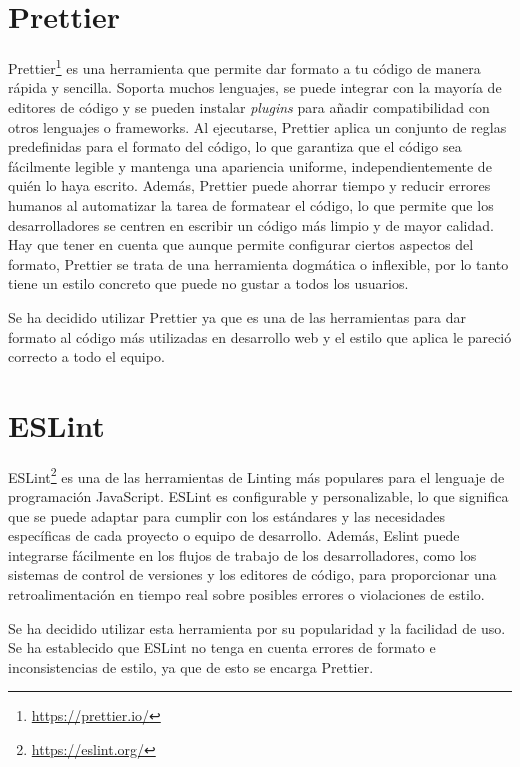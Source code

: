 \section{Prettier}\label{sec:prettier}
Prettier\footnote{\url{https://prettier.io/}} es una herramienta que permite dar formato a tu código de manera rápida y sencilla. Soporta muchos lenguajes, se puede integrar con la mayoría de editores de código y se pueden instalar \textit{plugins} para añadir compatibilidad con otros lenguajes o frameworks. Al ejecutarse, Prettier aplica un conjunto de reglas predefinidas para el formato del código, lo que garantiza que el código sea fácilmente legible y mantenga una apariencia uniforme, independientemente de quién lo haya escrito. Además, Prettier puede ahorrar tiempo y reducir errores humanos al automatizar la tarea de formatear el código, lo que permite que los desarrolladores se centren en escribir un código más limpio y de mayor calidad. Hay que tener en cuenta que aunque permite configurar ciertos aspectos del formato, Prettier se trata de una herramienta dogmática o inflexible, por lo tanto tiene un estilo concreto que puede no gustar a todos los usuarios.

Se ha decidido utilizar Prettier ya que es una de las herramientas para dar formato al código más utilizadas en desarrollo web y el estilo que aplica le pareció correcto a todo el equipo.

\section{ESLint}\label{sec:eslint}
ESLint\footnote{\url{https://eslint.org/}} es una de las herramientas de Linting más populares para el lenguaje de programación JavaScript. ESLint es configurable y personalizable, lo que significa que se puede adaptar para cumplir con los estándares y las necesidades específicas de cada proyecto o equipo de desarrollo. Además, Eslint puede integrarse fácilmente en los flujos de trabajo de los desarrolladores, como los sistemas de control de versiones y los editores de código, para proporcionar una retroalimentación en tiempo real sobre posibles errores o violaciones de estilo.

Se ha decidido utilizar esta herramienta por su popularidad y la facilidad de uso. Se ha establecido que ESLint no tenga en cuenta errores de formato e inconsistencias de estilo, ya que de esto se encarga Prettier.